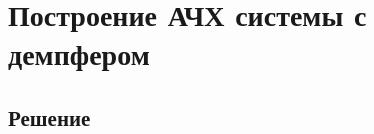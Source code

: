 \documentclass[a4paper,14pt]{extarticle}
\begin{document}
    \hypertarget{ux43fux43eux441ux442ux440ux43eux435ux43dux438ux435-ux430ux447ux445-ux441ux438ux441ux442ux435ux43cux44b-ux441-ux434ux435ux43cux43fux444ux435ux440ux43eux43c}{%
\section{Построение АЧХ системы с
демпфером}\label{ux43fux43eux441ux442ux440ux43eux435ux43dux438ux435-ux430ux447ux445-ux441ux438ux441ux442ux435ux43cux44b-ux441-ux434ux435ux43cux43fux444ux435ux440ux43eux43c}}

    \hypertarget{ux440ux435ux448ux435ux43dux438ux435}{%
\subsection{Решение}\label{ux440ux435ux448ux435ux43dux438ux435}}
\end{document}
